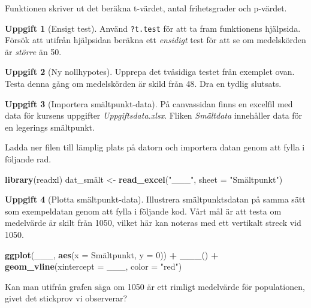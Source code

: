\documentclass[
]{book}
\newenvironment{Shaded}{\begin{snugshade}}{\end{snugshade}}
\newcommand{\AttributeTok}[1]{\textcolor[rgb]{0.13,0.29,0.53}{#1}}
\newcommand{\DecValTok}[1]{\textcolor[rgb]{0.00,0.00,0.81}{#1}}
\newcommand{\FunctionTok}[1]{\textcolor[rgb]{0.13,0.29,0.53}{\textbf{#1}}}
\newcommand{\NormalTok}[1]{#1}
\newcommand{\OtherTok}[1]{\textcolor[rgb]{0.56,0.35,0.01}{#1}}
\newcommand{\SpecialCharTok}[1]{\textcolor[rgb]{0.81,0.36,0.00}{\textbf{#1}}}
\newcommand{\StringTok}[1]{\textcolor[rgb]{0.31,0.60,0.02}{#1}}
\theoremstyle{definition}
\theoremstyle{definition}
\theoremstyle{definition}
\newtheorem{exercise}{Uppgift}[chapter]
\theoremstyle{definition}
\theoremstyle{remark}
\begin{document}
Funktionen skriver ut det beräkna t-värdet, antal frihetsgrader och p-värdet.

\begin{exercise}[Ensigt test]
Använd \texttt{?t.test} för att ta fram funktionens hjälpsida. Försök att utifrån hjälpsidan beräkna ett \emph{ensidigt} test för att se om medelskörden är \emph{större} än 50.
\end{exercise}

\begin{exercise}[Ny nollhypotes]
Upprepa det tvåsidiga testet från exemplet ovan. Testa denna gång om medelskörden är skild från 48. Dra en tydlig slutsats.
\end{exercise}

\begin{exercise}[Importera smältpunkt-data]

På canvassidan finns en excelfil med data för kursens uppgifter \emph{Uppgiftsdata.xlsx}. Fliken \emph{Smältdata} innehåller data för en legerings smältpunkt.

Ladda ner filen till lämplig plats på datorn och importera datan genom att fylla i följande rad.

\begin{Shaded}
\begin{Highlighting}[]
\FunctionTok{library}\NormalTok{(readxl)}
\NormalTok{dat\_smält }\OtherTok{\textless{}{-}} \FunctionTok{read\_excel}\NormalTok{(}\StringTok{"\_\_\_"}\NormalTok{, }\AttributeTok{sheet =} \StringTok{"Smältpunkt"}\NormalTok{)}
\end{Highlighting}
\end{Shaded}

\end{exercise}

\begin{exercise}[Plotta smältpunkt-data]
Illustrera smältpunktsdatan på samma sätt som exempeldatan genom att fylla i följande kod. Vårt mål är att testa om medelvärde är skilt från 1050, vilket här kan noteras med ett vertikalt streck vid 1050.

\begin{Shaded}
\begin{Highlighting}[]
\FunctionTok{ggplot}\NormalTok{(\_\_\_, }\FunctionTok{aes}\NormalTok{(}\AttributeTok{x =}\NormalTok{ Smältpunkt, }\AttributeTok{y =} \DecValTok{0}\NormalTok{)) }\SpecialCharTok{+} 
  \FunctionTok{\_\_\_}\NormalTok{() }\SpecialCharTok{+}
  \FunctionTok{geom\_vline}\NormalTok{(}\AttributeTok{xintercept =}\NormalTok{ \_\_\_, }\AttributeTok{color =} \StringTok{"red"}\NormalTok{)}
\end{Highlighting}
\end{Shaded}

Kan man utifrån grafen säga om 1050 är ett rimligt medelvärde för populationen, givet det stickprov vi observerar?
\end{exercise}
\end{document}
